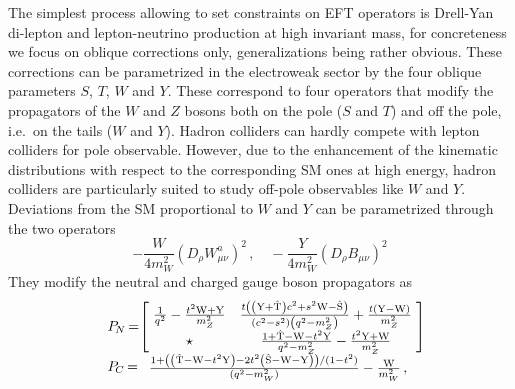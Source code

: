 The simplest process allowing to set constraints on EFT operators is Drell-Yan di-lepton and lepton-neutrino production at high invariant mass, for concreteness we focus on oblique corrections only, generalizations being rather obvious. These corrections can be parametrized in the electroweak sector by the four oblique parameters $S$, $T$, $W$ and $Y$. These correspond to four operators that modify the propagators of the $W$ and $Z$ bosons both on the pole ($S$ and $T$) and off the pole, i.e.~on the tails ($W$ and $Y$). Hadron colliders can hardly compete with lepton colliders for pole observable. However, due to the enhancement of the kinematic distributions with respect to the corresponding SM ones at high energy, hadron colliders are particularly suited to study off-pole observables like $W$ and $Y$. Deviations from the SM proportional to $W$ and $Y$ can be parametrized through the two operators
\begin{equation}
 -\frac{W}{4m_W^2}(D_\rho W_{\mu\nu}^a)^2   \,, \quad  -\frac{Y}{4m_W^2}(D_\rho B_{\mu\nu})^2   
 \end{equation}
They modify the neutral and charged gauge boson propagators as
\begin{equation}\label{eq:propagators}
\begin{array}{ll}
& P_{\hspace{-1pt}{N}}\hspace{-1pt} = \hspace{-2.5pt}\left[\hspace{-2pt}
\begin{array}{cc}
 \frac{1}{q^2}-\frac{t^{2}{\rm{\sc{W}}}+{\rm{\sc{Y}}}}{m_Z^2} & \frac{t \left(\left({\rm{\sc{Y}}}+{\rm\hat{T}}\right) c^2+s^2 {\rm{\sc{W}}}-{\rm\hat{S}}\right)}{\left(c^2-s^2\right) \left(q^2-m_Z^2\right)}+\frac{t ({\rm{\sc{Y}}}-{\rm{\sc{W}}})}{m_Z^2} \\
 \star & \frac{1+ {\rm\hat{T}}-{\rm{\sc{W}}}-t^{2}{\rm{\sc{Y}}}}{q^2-m_Z^2}-\frac{t^{2}{\rm{\sc{Y}}}+{\rm{\sc{W}}}}{m_Z^2} \\
\end{array}
\hspace{-2pt}
\right] \\
& P_{\hspace{-1pt}{C}}\hspace{-1pt} =
\begin{array}{c}
\frac{1+\left( \left({\rm\hat{T}}-{\rm{\sc{W}}}-t^2 {\rm{\sc{Y}}}\right)-2 t^2 \left({\rm\hat{S}}-{\rm{\sc{W}}}-{\rm{\sc{Y}}}\right)\right)/(1-t^2)}{(q^{2}-m_W^2)}-\frac{{\rm{\sc{W}}}}{m_W^2}\,,
\end{array}
\end{array}
\end{equation}
